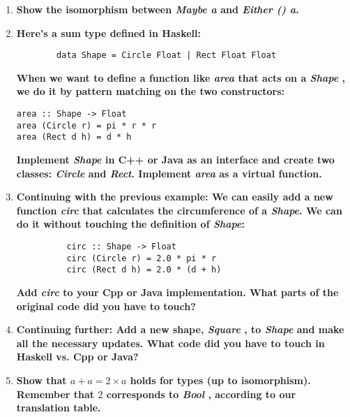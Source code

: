 \documentclass{article}
\begin{document}
\begin{enumerate}
	\item \textbf{Show the isomorphism between \textit{Maybe a} and \textit{Either () a}.}
	\item \textbf{Here's a sum type defined in Haskell:}

	      \begin{verbatim}
		data Shape = Circle Float | Rect Float Float
		\end{verbatim}
	      \textbf{When we want to define a function like \textit{area} that acts on a \textit{Shape} , we do it by pattern matching on the two constructors: }
	      \begin{verbatim}
area :: Shape -> Float 
area (Circle r) = pi * r * r
area (Rect d h) = d * h
\end{verbatim}
	      \textbf{Implement \textit{Shape} in C++ or Java as an interface and create two classes: \textit{Circle} and \textit{Rect}. Implement \textit{area} as a virtual function.}

	\item \textbf{Continuing with the previous example: We can easily add a new function \textit{circ} that calculates the circumference of a \textit{Shape}. We can do it without touching the definition of \textit{Shape}:  }
	      \begin{verbatim}
	      circ :: Shape -> Float
	      circ (Circle r) = 2.0 * pi * r
	      circ (Rect d h) = 2.0 * (d + h)
	      \end{verbatim}
	      \textbf{Add \textit{circ} to your Cpp or Java implementation. What parts of the original code did you have to touch?}


	\item \textbf{Continuing further: Add a new shape, \textit{Square} , to \textit{Shape} and make all the necessary updates. What code did you have to touch in Haskell vs. Cpp or Java? }

	\item \textbf{Show that $ a + a = 2 \times a $ holds for types (up to isomorphism). Remember that $ 2 $ corresponds to \textit{Bool} , according to our translation table.}
\end{enumerate}
\end{document}
